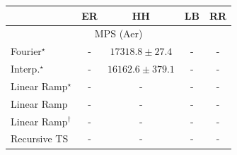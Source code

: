 \begin{tabular}{l|cccc|}
\toprule
            & ER & HH & LB & RR \\
\midrule
\multicolumn{5}{c}{\rule{0pt}{8pt}MPS (Aer)} \\
\midrule
Fourier$^\star$ & {\cellcolor[HTML]{000000}} \color[HTML]{F1F1F1} {\cellcolor{white}} \color{black} - & {\cellcolor[HTML]{4D004B}} \color[HTML]{F1F1F1} $17318.8\pm 27.4$ & {\cellcolor[HTML]{000000}} \color[HTML]{F1F1F1} {\cellcolor{white}} \color{black} - & {\cellcolor[HTML]{000000}} \color[HTML]{F1F1F1} {\cellcolor{white}} \color{black} - \\
Interp.$^\star$ & {\cellcolor[HTML]{000000}} \color[HTML]{F1F1F1} {\cellcolor{white}} \color{black} - & {\cellcolor[HTML]{F7FCFD}} \color[HTML]{000000} $16162.6\pm 379.1$ & {\cellcolor[HTML]{000000}} \color[HTML]{F1F1F1} {\cellcolor{white}} \color{black} - & {\cellcolor[HTML]{000000}} \color[HTML]{F1F1F1} {\cellcolor{white}} \color{black} - \\
Linear Ramp$^\star$ & {\cellcolor[HTML]{000000}} \color[HTML]{F1F1F1} {\cellcolor{white}} \color{black} - & {\cellcolor[HTML]{000000}} \color[HTML]{F1F1F1} {\cellcolor{white}} \color{black} - & {\cellcolor[HTML]{000000}} \color[HTML]{F1F1F1} {\cellcolor{white}} \color{black} - & {\cellcolor[HTML]{000000}} \color[HTML]{F1F1F1} {\cellcolor{white}} \color{black} - \\
Linear Ramp & {\cellcolor[HTML]{000000}} \color[HTML]{F1F1F1} {\cellcolor{white}} \color{black} - & {\cellcolor[HTML]{000000}} \color[HTML]{F1F1F1} {\cellcolor{white}} \color{black} - & {\cellcolor[HTML]{000000}} \color[HTML]{F1F1F1} {\cellcolor{white}} \color{black} - & {\cellcolor[HTML]{000000}} \color[HTML]{F1F1F1} {\cellcolor{white}} \color{black} - \\
Linear Ramp$^\dagger$ & {\cellcolor[HTML]{000000}} \color[HTML]{F1F1F1} {\cellcolor{white}} \color{black} - & {\cellcolor[HTML]{000000}} \color[HTML]{F1F1F1} {\cellcolor{white}} \color{black} - & {\cellcolor[HTML]{000000}} \color[HTML]{F1F1F1} {\cellcolor{white}} \color{black} - & {\cellcolor[HTML]{000000}} \color[HTML]{F1F1F1} {\cellcolor{white}} \color{black} - \\
Recursive TS & {\cellcolor[HTML]{000000}} \color[HTML]{F1F1F1} {\cellcolor{white}} \color{black} - & {\cellcolor[HTML]{000000}} \color[HTML]{F1F1F1} {\cellcolor{white}} \color{black} - & {\cellcolor[HTML]{000000}} \color[HTML]{F1F1F1} {\cellcolor{white}} \color{black} - & {\cellcolor[HTML]{000000}} \color[HTML]{F1F1F1} {\cellcolor{white}} \color{black} - \\

\end{tabular}
